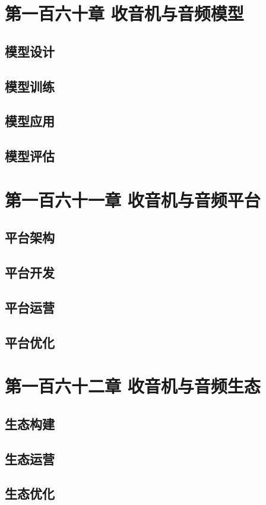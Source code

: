 \documentclass[12pt,UTF8]{ctexbook}
\begin{document}
\chapter{第一百六十章 收音机与音频模型}

\section{模型设计}
\section{模型训练}
\section{模型应用}
\section{模型评估}

\chapter{第一百六十一章 收音机与音频平台}

\section{平台架构}
\section{平台开发}
\section{平台运营}
\section{平台优化}

\chapter{第一百六十二章 收音机与音频生态}

\section{生态构建}
\section{生态运营}
\section{生态优化}
\end{document}
